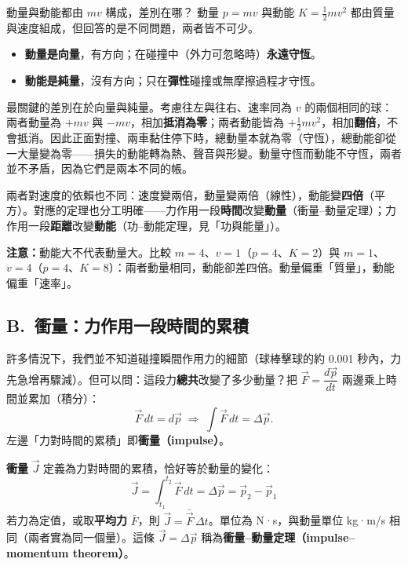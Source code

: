 \documentclass[11pt]{article}
\begin{document}
\begin{補充框}{動量與動能都由 $mv$ 構成，差別在哪？}
動量 $p=mv$ 與動能 $K=\tfrac12 mv^2$ 都由質量與速度組成，但回答的是不同問題，兩者皆不可少。
\begin{itemize}\setlength{\itemsep}{1pt}
\item \textbf{動量是向量}，有方向；在碰撞中（外力可忽略時）\textbf{永遠守恆}。
\item \textbf{動能是純量}，沒有方向；只在\textbf{彈性}碰撞或無摩擦過程才守恆。
\end{itemize}
最關鍵的差別在於向量與純量。考慮往左與往右、速率同為 $v$ 的兩個相同的球：兩者動量為 $+mv$ 與 $-mv$，相加\textbf{抵消為零}；兩者動能皆為 $+\tfrac12 mv^2$，相加\textbf{翻倍}，不會抵消。因此正面對撞、兩車黏住停下時，總動量本就為零（守恆），總動能卻從一大量變為零——損失的動能轉為熱、聲音與形變。動量守恆而動能不守恆，兩者並不矛盾，因為它們是兩本不同的帳。

兩者對速度的依賴也不同：速度變兩倍，動量變兩倍（線性），動能變\textbf{四倍}（平方）。對應的定理也分工明確——力作用一段\textbf{時間}改變\textbf{動量}（衝量–動量定理）；力作用一段\textbf{距離}改變\textbf{動能}（功–動能定理，見「功與能量」）。

\textbf{注意：}動能大不代表動量大。比較 $m=4$、$v=1$（$p=4$、$K=2$）與 $m=1$、$v=4$（$p=4$、$K=8$）：兩者動量相同，動能卻差四倍。動量偏重「質量」，動能偏重「速率」。
\end{補充框}

\subsection*{\sffamily B.\ 衝量：力作用一段時間的累積}

許多情況下，我們並不知道碰撞瞬間作用力的細節（球棒擊球的約 0.001 秒內，力先急增再驟減）。但可以問：這段力\textbf{總共}改變了多少動量？把 $\vec F=\dfrac{d\vec p}{dt}$ 兩邊乘上時間並累加（積分）：
$$\vec F\,dt = d\vec p \;\Longrightarrow\; \int \vec F\,dt = \Delta\vec p.$$
左邊「力對時間的累積」即\textbf{衝量（impulse）}。

\textbf{衝量} $\vec J$ 定義為力對時間的累積，恰好等於動量的變化：
$$\boxed{\,\vec J = \int_{t_1}^{t_2}\vec F\,dt = \Delta\vec p = \vec p_2-\vec p_1\,}$$
若力為定值，或取\textbf{平均力} $\bar F$，則 $\vec J=\bar{\vec F}\,\Delta t$。單位為 N·s，與動量單位 kg·m/s 相同（兩者實為同一個量）。這條 $\vec J=\Delta\vec p$ 稱為\textbf{衝量–動量定理（impulse–momentum theorem）}。

\end{document}

